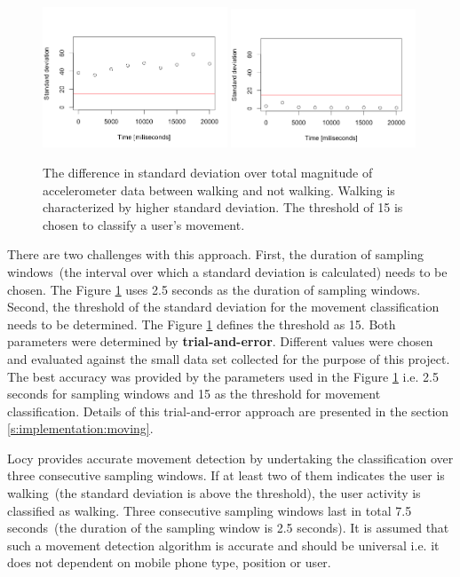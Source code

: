 \begin{figure}[H]
\centering
\includegraphics[width=0.49\textwidth, scale=0.6]{plots/stddev_walking}
\includegraphics[width=0.49\textwidth, scale=0.6]{plots/stddev_no_walking}
\caption{\label{p:moving:stddev} The difference in standard deviation over total magnitude of accelerometer data between walking and not walking. Walking is characterized by higher standard deviation. The threshold of 15 is chosen to classify a user's movement.}
\end{figure}

There are two challenges with this approach. First, the duration of sampling windows\ (the interval over which a standard deviation is calculated) needs to be chosen. The Figure \ref{p:moving:stddev} uses 2.5 seconds as the duration of sampling windows. Second, the threshold of the standard deviation for the movement classification needs to be determined. The Figure \ref{p:moving:stddev} defines the threshold as 15. Both parameters were determined by \textbf{trial-and-error}. Different values were chosen and evaluated against the small data set collected for the purpose of this project. The best accuracy was provided by the parameters used in the Figure \ref{p:moving:stddev} i.e. 2.5 seconds for sampling windows and 15 as the threshold for movement classification. Details of this trial-and-error approach are presented in the section \ref{s:implementation:moving}.

Locy provides accurate movement detection by undertaking the classification over three consecutive sampling windows. If at least two of them indicates the user is walking\ (the standard deviation is above the threshold), the user activity is classified as walking. Three consecutive sampling windows last in total 7.5 seconds\ (the duration of the sampling window is 2.5 seconds). It is assumed that such a movement detection algorithm is accurate and should be universal i.e. it does not dependent on mobile phone type, position or user.

